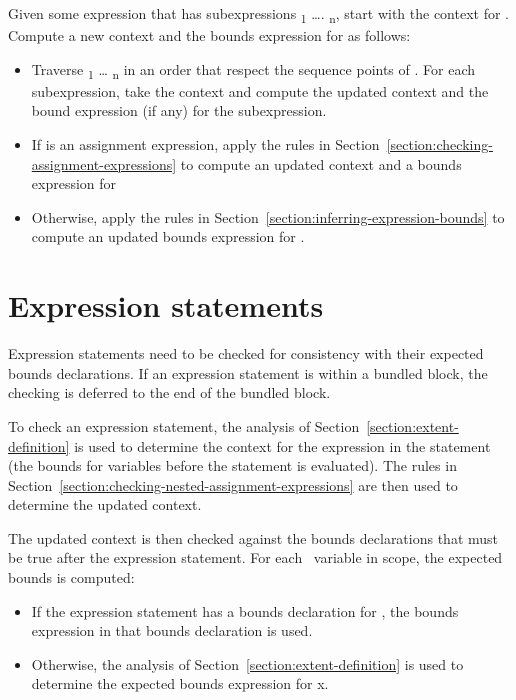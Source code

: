 Given some expression  that has subexpressions \textsubscript{1}
\ldots{}. \textsubscript{n}, start with the context for . Compute a
new context and the bounds expression for  as follows:

\begin{itemize}
\item
  Traverse \textsubscript{1} \ldots{} \textsubscript{n} in an order
  that respect the sequence points of \cite{ISO2011}. For each subexpression, take the
  context and compute the updated context and the bound expression (if
  any) for the subexpression.
\item
  If  is an assignment expression, 
  apply the rules in Section~\ref{section:checking-assignment-expressions} to
  compute an updated context and a bounds expression for 
\item
  Otherwise, apply the rules in Section~\ref{section:inferring-expression-bounds}
  to compute an updated bounds expression for .
\end{itemize}

\section{Expression statements}
\label{section:checking-expression-statements}

Expression statements need to be checked for consistency with their
expected bounds declarations. If an expression statement is within a
bundled block, the checking is deferred to the end of the bundled block.

To check an expression statement, the analysis of 
Section~\ref{section:extent-definition} is used
to determine the context for the expression in the statement (the bounds
for variables before the statement is evaluated). The rules in 
Section~\ref{section:checking-nested-assignment-expressions}
are then used to determine the updated context.

The updated context is then checked against the bounds declarations that
must be true after the expression statement. For each
\arrayptr\ variable  in scope, the expected bounds is
computed:

\begin{itemize}
\item
  If the expression statement has a bounds declaration for , the
  bounds expression in that bounds declaration is used.
\item
  Otherwise, the analysis of Section~\ref{section:extent-definition}
  is used to determine the
  expected bounds expression for x.
\end{itemize}

